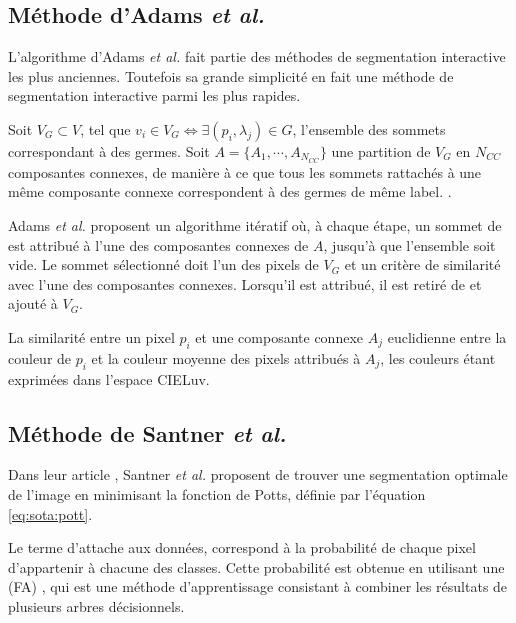 \subsection{Méthode d'Adams \textit{et al.}}

L'algorithme d'Adams \textit{et al.} \cite{adams1994seeded} fait partie des méthodes de segmentation interactive les plus anciennes. Toutefois\modif{,} sa grande simplicité en fait une méthode de segmentation interactive  parmi  les plus rapides.

 Soit $V_{G} \subset V $, tel que $v_{i} \in  V_{G} \Leftrightarrow \exists (p_{i},\lambda_{j}) \in G$, l'ensemble des sommets correspondant à des germes. Soit $A= \lbrace A_{1}, \cdots, A_{N_{CC}} \rbrace $  une partition de $V_{G}$ en $N_{CC}$ composantes connexes, de manière à ce que tous les sommets rattachés à une même composante connexe correspondent à des germes de même label. . 
 
Adams \textit{et al.} proposent un algorithme itératif où, à chaque étape, un sommet de  est attribué à l'une des composantes connexes de $A$, jusqu'à que l'ensemble  soit vide. Le sommet sélectionné doit  l'un des pixels de $V_{G}$ et  un critère de similarité avec l'une des composantes connexes. Lorsqu'il est attribué, il est retiré de  et ajouté à $V_{G}$.

La similarité entre un pixel $p_{i}$ et une composante connexe $A_{j}$  euclidienne entre la couleur de $p_{i}$ et la couleur moyenne des pixels attribués à $A_{j}$, les couleurs étant exprimées dans l'espace CIELuv.


\subsection{Méthode de Santner \textit{et al.}}
\label{sec:sota:santner}

Dans leur article \cite{santner2010interactive}, Santner \textit{et al.} proposent de trouver une segmentation optimale de l'image en minimisant la fonction de Potts, définie par l'équation \ref{eq:sota:pott}.

Le terme d'attache aux données,  correspond à la probabilité de chaque pixel d'appartenir à chacune des classes. Cette probabilité est obtenue en utilisant une  (FA) \cite{breiman2001random}, qui est une méthode d'apprentissage consistant à combiner les résultats de plusieurs arbres décisionnels.


